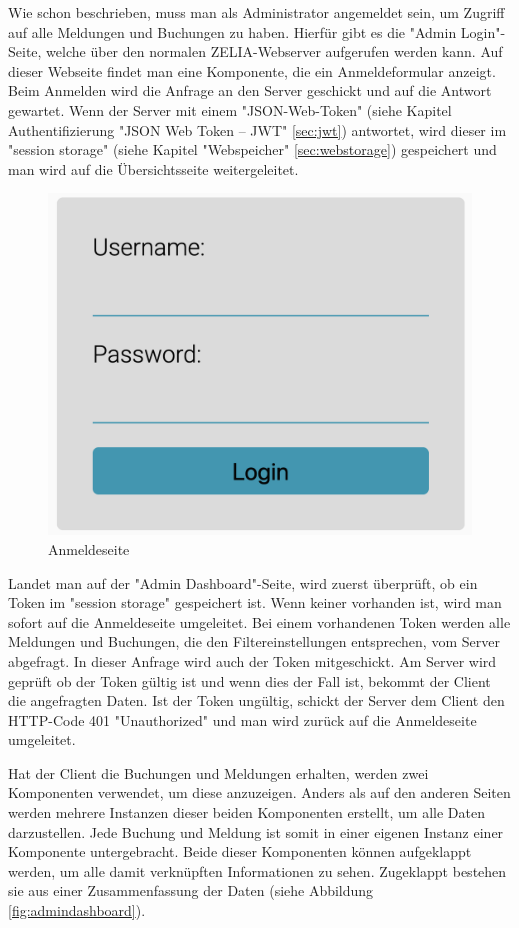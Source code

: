 Wie schon beschrieben, muss man als Administrator angemeldet sein, um Zugriff auf alle Meldungen und Buchungen zu haben. Hierfür gibt es die "Admin Login"-Seite, welche über den normalen ZELIA-Webserver aufgerufen werden kann. Auf dieser Webseite findet man eine Komponente, die ein Anmeldeformular anzeigt. Beim Anmelden wird die Anfrage an den Server geschickt und auf die Antwort gewartet. Wenn der Server mit einem "JSON-Web-Token" (siehe Kapitel Authentifizierung "JSON Web Token -- JWT" \ref{sec:jwt}) antwortet, wird dieser im "session storage" (siehe Kapitel "Webspeicher" \ref{sec:webstorage}) gespeichert und man wird auf die Übersichtsseite weitergeleitet.

\begin{figure}[H]
    \centering
    \includegraphics[width=120mm]{media/WebComponents/Login_light.png}
    \caption{Anmeldeseite}
\end{figure}

Landet man auf der "Admin Dashboard"-Seite, wird zuerst überprüft, ob ein Token im "session storage" gespeichert ist. Wenn keiner vorhanden ist, wird man sofort auf die Anmeldeseite umgeleitet. Bei einem vorhandenen Token werden alle Meldungen und Buchungen, die den Filtereinstellungen entsprechen, vom Server abgefragt. In dieser Anfrage wird auch der Token mitgeschickt. Am Server wird geprüft ob der Token gültig ist und wenn dies der Fall ist, bekommt der Client die angefragten Daten. Ist der Token ungültig, schickt der Server dem Client den HTTP-Code 401 "Unauthorized" und man wird zurück auf die Anmeldeseite umgeleitet.

Hat der Client die Buchungen und Meldungen erhalten, werden zwei Komponenten verwendet, um diese anzuzeigen. Anders als auf den anderen Seiten werden mehrere Instanzen dieser beiden Komponenten erstellt, um alle Daten darzustellen. Jede Buchung und Meldung ist somit in einer eigenen Instanz einer Komponente untergebracht. Beide dieser Komponenten können aufgeklappt werden, um alle damit verknüpften Informationen zu sehen. Zugeklappt bestehen sie aus einer Zusammenfassung der Daten (siehe Abbildung \ref{fig:admindashboard}).

